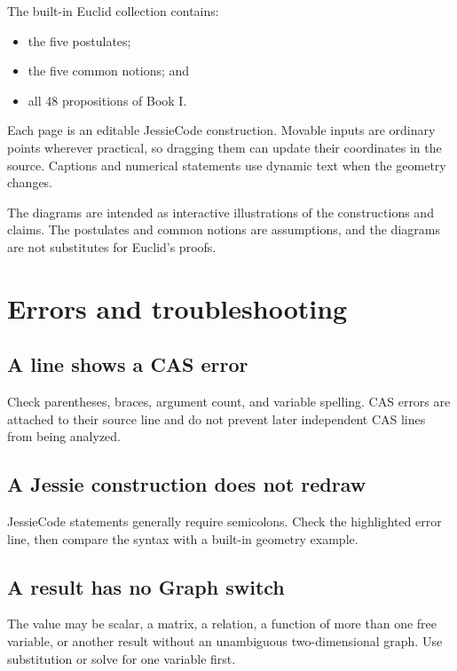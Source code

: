 \documentclass[11pt,a4paper]{article}
\begin{document}
The built-in Euclid collection contains:

\begin{itemize}
  \item the five postulates;
  \item the five common notions; and
  \item all 48 propositions of Book I.
\end{itemize}

Each page is an editable JessieCode construction. Movable inputs are ordinary points wherever practical, so dragging them can update their coordinates in the source. Captions and numerical statements use dynamic text when the geometry changes.

The diagrams are intended as interactive illustrations of the constructions and claims. The postulates and common notions are assumptions, and the diagrams are not substitutes for Euclid's proofs.

\section{Errors and troubleshooting}

\subsection{A line shows a CAS error}

Check parentheses, braces, argument count, and variable spelling. CAS errors are attached to their source line and do not prevent later independent CAS lines from being analyzed.

\subsection{A Jessie construction does not redraw}

JessieCode statements generally require semicolons. Check the highlighted error line, then compare the syntax with a built-in geometry example.

\subsection{A result has no Graph switch}

The value may be scalar, a matrix, a relation, a function of more than one free variable, or another result without an unambiguous two-dimensional graph. Use substitution or solve for one variable first.
\end{document}
